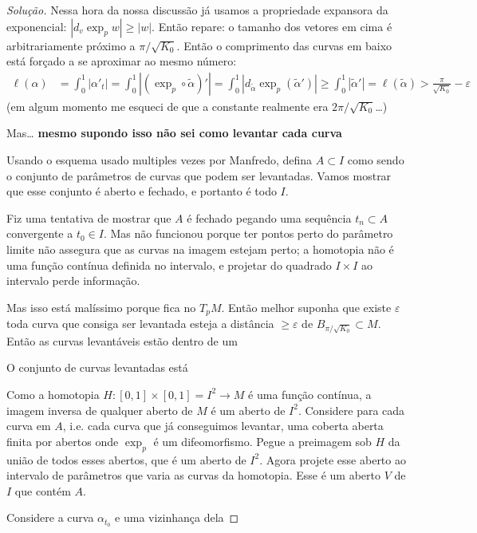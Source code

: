 \begin{proof}[Solução]
Nessa hora da nossa discussão já usamos a propriedade expansora da exponencial: \(|d_v \operatorname{exp}_pw|\geq |w|\). Então repare: o tamanho dos vetores em cima é arbitrariamente próximo a \(\pi/\sqrt{K_0}\). Então o comprimento das curvas em baixo está forçado a se aproximar ao mesmo número:
\begin{align*}
\ell(\alpha)&=\int_0^1 |\alpha'_t|=\int_0^1 |(\operatorname{exp}_p \circ \tilde{\alpha})'|=\int_0^1 |d_{\tilde{\alpha}}\operatorname{exp}_p(\tilde{\alpha}')|\geq \int_0^1|\tilde{\alpha}'|=\ell(\tilde{\alpha})>\frac{\pi}{\sqrt{K_0}}-\varepsilon
\end{align*}
(em algum momento me esqueci de que a constante realmente era \(2\pi/\sqrt{K_0}\)…)
\iffalse

Mas… \textbf{mesmo supondo isso não sei como levantar cada curva} 


Usando o esquema usado multiples vezes por Manfredo, defina \(A \subset I\) como sendo o conjunto de parâmetros de curvas que podem ser levantadas. Vamos mostrar que esse conjunto é aberto e fechado, e portanto é todo \(I\).

Fiz uma tentativa de mostrar que \(A\) é fechado pegando uma sequência \(t_n \subset A\) convergente a \(t_0 \in I\). Mas não funcionou porque ter pontos perto do parâmetro limite não assegura que as curvas na imagem estejam perto; a homotopia não é uma função contínua definida no intervalo, e projetar do quadrado \(I \times I\) ao intervalo perde informação.

Mas isso está malíssimo porque fica no \(T_pM\). Então melhor suponha que existe \(\varepsilon\) toda curva que consiga ser levantada esteja a distância \(\geq \varepsilon\) de \(B_{\pi/\sqrt{K_0}}\subset M\). Então as curvas levantáveis estão dentro de um 

O conjunto de curvas levantadas está 


Como a homotopia \(H:[0,1]\times[0,1]=I^2 \to M\) é uma função contínua, a imagem inversa de qualquer aberto de \(M\) é um aberto de \(I^2\). Considere para cada curva em \(A\), i.e. cada curva que já conseguimos levantar, uma coberta aberta finita por abertos onde \(\operatorname{exp}_p\) é um difeomorfismo. Pegue a preimagem sob \(H\) da união de todos esses abertos, que é um aberto de \(I^2\). Agora projete esse aberto ao intervalo de parâmetros que varia as curvas da homotopia. Esse é um aberto \(V\) de \(I\) que contém \(A\).

 Considere a curva \(\alpha_{t_0}\) e uma vizinhança dela 






\end{proof}
